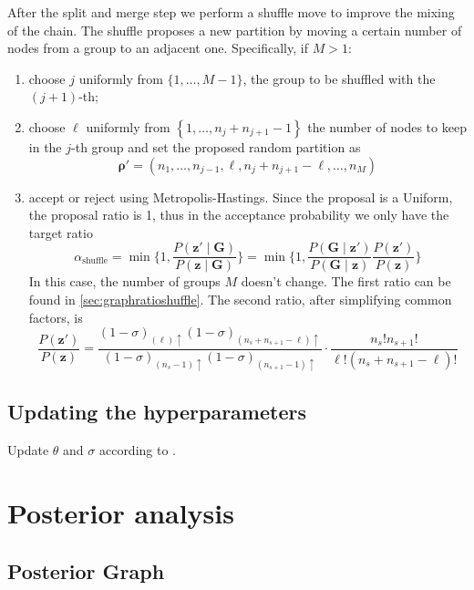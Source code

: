 After the split and merge step we perform a shuffle move to improve the mixing of the chain.
The shuffle proposes a new partition by moving a certain number of nodes from a group to an adjacent one.
Specifically, if $M>1$:
\begin{enumerate}
    \item choose $j$ uniformly from $\{1, \ldots, M-1\}$, the group to be shuffled with the $(j+1)$-th;
    \item choose $\ell$ uniformly from $\left\{1, \ldots, n_j+n_{j+1}-1\right\}$ the number of nodes to keep in the $j$-th group and set the proposed random partition as
    \[
        \bm{\rho}'=\left(n_1, \ldots, n_{j-1}, \ell, n_j+n_{j+1}-\ell, \ldots, n_M\right)
    \]
    \item accept or reject using Metropolis-Hastings. Since the proposal is a Uniform, the proposal ratio is 1, thus in the acceptance probability we only have the target ratio
    \[
       \alpha_{\text{shuffle}}
       =
       \min
       \bigg\{1,
       \frac{P(\bm{z}'\mid \bm{G})}{P(\bm{z}\mid \bm{G})}
       \bigg\}
       =
       \min
       \bigg\{1,
       \frac{P(\bm{G}\mid \bm{z}')}{P(\bm{G}\mid \bm{z})}
       \frac{P(\bm{z}')}{P(\bm{z})}
       \bigg\}
    \]
    In this case, the number of groups $M$ doesn't change.
    The first ratio can be found in \ref{sec:graphratioshuffle}.
    The second ratio, after simplifying common factors, is
    \[
        \frac{P(\bm{z}')}{P(\bm{z})} = \frac{(1-\sigma)_{(\ell)\uparrow} (1-\sigma)_{(n_{s}+n_{s+1}-\ell)\uparrow}}{(1-\sigma)_{(n_{s}-1)\uparrow} (1-\sigma)_{(n_{s+1}-1)\uparrow}}
        \cdot \frac{n_{s}! n_{s+1}!}{\ell!(n_{s} + n_{s+1} - \ell)!}
    \]
    
\end{enumerate}

\subsection{Updating the hyperparameters}

Update $\theta$ and $\sigma$ according to \textcite[835-836]{martinezNonparametricChangePoint2014}.


\section{Posterior analysis}


\subsection{Posterior Graph}

